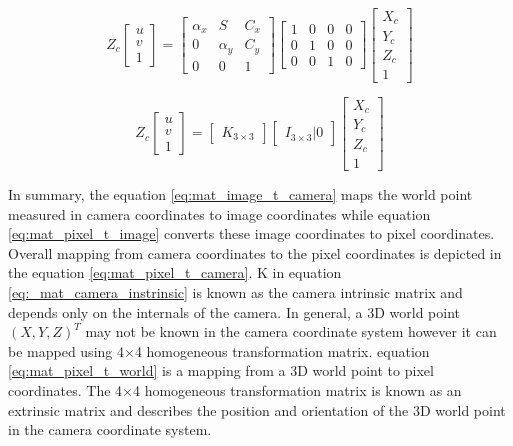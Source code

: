 \begin{equation}
Z_c \left[ 
\begin{array}{c} u\\ v\\ 1 \end{array} 
\right] = 
\begin{bmatrix}
\alpha_x & S & C_x \\
0 & \alpha_y & C_y \\
0 & 0 & 1
\end{bmatrix} 
\begin{bmatrix}
1 & 0 & 0 & 0 \\
0 & 1 & 0 & 0 \\
0 & 0 & 1 & 0
\end{bmatrix}
\left[ 
\begin{array}{c} X_c\\ Y_c\\ Z_c\\ 1 \end{array} 
\right]
\label{eq:mat_pixel_t_camera}
\end{equation}

\begin{equation}
Z_c \left[ 
\begin{array}{c} u\\ v\\ 1 \end{array} 
\right] = 
\left[ 
\begin{array}{c} K_{3\times3} \end{array} 
\right] 
\left[ 
\begin{array}{c} I_{3\times3} | 0 \end{array} 
\right]
\left[ 
\begin{array}{c} X_c\\ Y_c\\ Z_c\\ 1 \end{array}
\right]
\label{eq:_mat_camera_instrinsic}
\end{equation}

In summary, the equation \ref{eq:mat_image_t_camera} maps the world point measured in camera coordinates to image coordinates while equation \ref{eq:mat_pixel_t_image} converts these image coordinates to pixel coordinates. Overall mapping from camera coordinates to the pixel coordinates is depicted in the equation \ref{eq:mat_pixel_t_camera}. K in equation \ref{eq:_mat_camera_instrinsic} is known as the camera intrinsic matrix and depends only on the internals of the camera. In general, a 3D world point \( (X, Y, Z)^T \) may not be known in the camera coordinate system however it can be mapped using 4$\times$4 homogeneous transformation matrix. equation \ref{eq:mat_pixel_t_world} is a mapping from a 3D world point to pixel coordinates. The 4$\times$4 homogeneous transformation matrix is known as an extrinsic matrix and describes the position and orientation of the 3D world point in the camera coordinate system.

